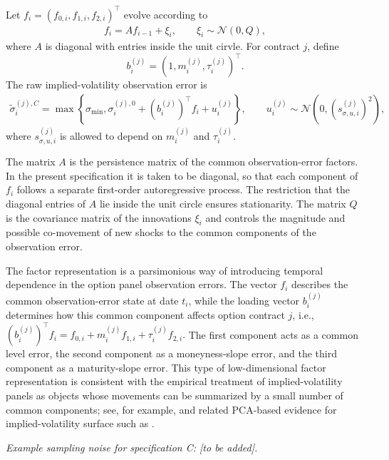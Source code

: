 \documentclass[11pt,a4paper,notitlepage]{article}
\numberwithin{equation}{section}
\begin{document}
Let
$f_i=(f_{0,i},f_{1,i},f_{2,i})^\top$ evolve according to
\begin{align}
f_i=A f_{i-1}+\xi_i,
\qquad
\xi_i\sim\mathcal{N}(0,Q),
\label{eq:factor_noise}
\end{align}
where $A$ is diagonal with entries inside the unit cirvle. For contract $j$, define
\[
b_i^{(j)}
=
\left(1,m_i^{(j)},\tau_i^{(j)}\right)^\top.
\]
The raw implied-volatility observation error is
\begin{align}
\tilde\sigma_i^{(j),C}
=
\max\left\{
\sigma_{\min},
\sigma_i^{(j),0}
+
\left(b_i^{(j)}\right)^\top f_i
+
u_i^{(j)}
\right\},
\qquad
u_i^{(j)}\sim\mathcal{N}\left(0,\left(s_{\sigma,u,i}^{(j)}\right)^2\right),
\label{eq:factor_iv_noise}
\end{align}
where $s_{\sigma,u,i}^{(j)}$ is allowed to depend on $m_i^{(j)}$ and $\tau_i^{(j)}$. 

The matrix $A$ is the persistence matrix of the common observation-error factors. In the present specification it is taken to be diagonal, so that each component of $f_i$ follows a separate first-order autoregressive process. The restriction that the diagonal entries of $A$ lie inside the unit circle ensures stationarity. The matrix $Q$ is the covariance matrix of the innovations $\xi_i$ and controls the magnitude and possible co-movement of new shocks to the common components of the observation error.

The factor representation is a parsimonious way of introducing temporal dependence in the option panel observation errors. The vector $f_i$ describes the common observation-error state at date $t_i$, while the loading vector $b_i^{(j)}$ determines how this common component affects option contract $j$, i.e., $\left(b_i^{(j)}\right)^\top f_i = f_{0,i}+m_i^{(j)}f_{1,i}+\tau_i^{(j)}f_{2,i}.$
The first component acts as a common level error, the second component as a moneyness-slope error, and the third component as a maturity-slope error. This type of low-dimensional factor representation is consistent with the empirical treatment of implied-volatility panels as objects whose movements can be summarized by a small number of common components; see, for example, \cite{cont2002dynamics} and related PCA-based evidence for implied-volatility surface such as  \cite{avellaneda2020pca}.

\emph{Example sampling noise for specification C: [to be added].}
\end{document}
